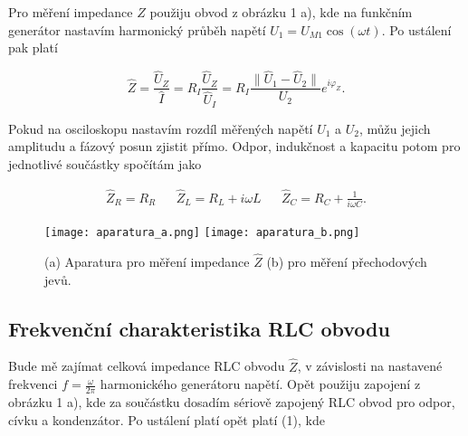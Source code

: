 \documentclass[a4paper,11pt]{article}
\begin{document}
Pro měření impedance $ \hat{Z} $ použiju obvod z obrázku 1 a), kde na funkčním generátor nastavím harmonický průběh napětí $ U_1 = U_{M1} \cos ( \omega t ) $. Po ustálení pak platí

\begin{equation}
    \hat{Z} = \frac{\hat{U}_Z}{\hat{I}} = R_I \frac{\hat{U}_Z}{\hat{U}_I} = R_I \frac{\| \hat{U}_1 - \hat{U}_2 \| }{U_2} e^{i \varphi_Z}.
\end{equation}

Pokud na osciloskopu nastavím rozdíl měřených napětí $ U_1 $ a $ U_2 $, můžu jejich amplitudu a fázový posun zjistit přímo. Odpor, indukčnost a kapacitu potom pro jednotlivé součástky spočítám jako 


\begin{align*}
    \hat{Z}_R = R_R && \hat{Z}_L = R_L + i \omega L  && \hat{Z}_C = R_C + \frac{1}{i \omega C} .
\end{align*}


\begin{figure}[htpb]
    \centering
    \texttt{[image: aparatura\_a.png]}
    \hfill
    \texttt{[image: aparatura\_b.png]}
    \caption{(a) Aparatura pro měření impedance $ \hat{Z} $ (b) pro měření přechodových jevů.}
\end{figure}

\subsection{Frekvenční charakteristika RLC obvodu}

Bude mě zajímat celková impedance RLC obvodu $ \hat{Z} $, v závislosti na nastavené frekvenci $ f = \frac{\omega}{2 \pi} $ harmonického generátoru napětí. Opět použiju zapojení z obrázku 1 a), kde za součástku dosadím sériově zapojený RLC obvod pro odpor, cívku a kondenzátor. Po ustálení platí opět platí (1), kde

\end{document}
